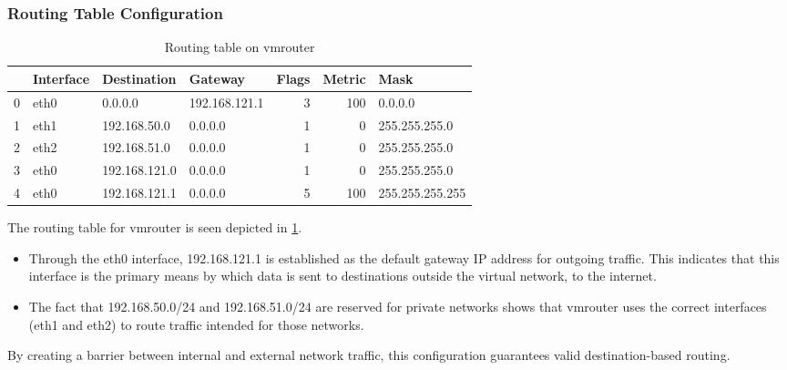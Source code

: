 \documentclass[12pt, fleqn, a4paper]{article}
\begin{document}
\subsubsection{Routing Table Configuration}
\begin{table}[H]
	\caption{Routing table on vmrouter}
	\centering
\begin{tabular}{llllrrl}
\toprule
{} & Interface &    Destination &        Gateway &  Flags &  Metric &             Mask \\
\midrule
0 &      eth0 &        0.0.0.0 &  192.168.121.1 &      3 &     100 &          0.0.0.0 \\
1 &      eth1 &   192.168.50.0 &        0.0.0.0 &      1 &       0 &    255.255.255.0 \\
2 &      eth2 &   192.168.51.0 &        0.0.0.0 &      1 &       0 &    255.255.255.0 \\
3 &      eth0 &  192.168.121.0 &        0.0.0.0 &      1 &       0 &    255.255.255.0 \\
4 &      eth0 &  192.168.121.1 &        0.0.0.0 &      5 &     100 &  255.255.255.255 \\
\bottomrule
\end{tabular}
  \label{tab:vmrouter2}
\end{table}
The routing table for vmrouter is seen depicted in \cref{tab:vmrouter2}. 
\begin{itemize}
  \item Through the eth0 interface, 192.168.121.1 is established as the default gateway IP address for outgoing traffic. This indicates that this interface is the primary means by which data is sent to destinations outside the virtual network, to the internet.
  \item The fact that 192.168.50.0/24 and 192.168.51.0/24 are reserved for private networks shows that vmrouter uses the correct interfaces (eth1 and eth2) to route traffic intended for those networks.
\end{itemize}
By creating a barrier between internal and external network traffic, this configuration guarantees valid destination-based routing.
\end{document}
